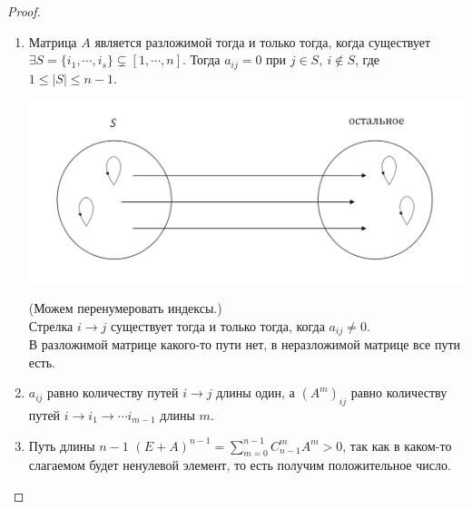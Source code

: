 \begin{proof}
    \ 
    \begin{enumerate}
    \item Матрица $A$ является разложимой тогда и только тогда, когда существует $\exists S=\{i_1,\cdots, i_s\} \subsetneq [1, \cdots, n]$. Тогда $a_{ij}=0$ при $j\in S,~i\notin S$, где $1\leqslant |S| \leqslant n-1$.\\
    \begin{center}
        \includegraphics[scale=0.6]{l14_3.png}\\
    \end{center}
    (Можем перенумеровать индексы.)\\
    Стрелка $i\to j$ существует тогда и только тогда, когда $a_{ij}\neq 0$.\\
    В разложимой матрице какого-то пути нет, в неразложимой матрице все пути есть.
    \item $a_{ij}$ равно количеству путей $i\to j$ длины один, а $(A^m)_{ij}$ равно количеству путей $i\to i_1\to \cdots i_{m-1}$ длины $m$.
    \item Путь длины $n-1$ $(E+A)^{n-1}=\sum\limits_{m=0}^{n-1}C_{n-1}^mA^m>0$, так как в каком-то слагаемом будет ненулевой элемент, то есть получим положительное число. 
\end{enumerate}
\end{proof}
